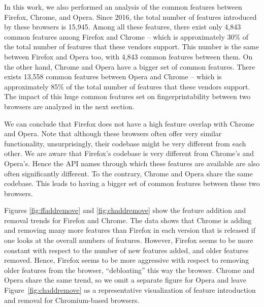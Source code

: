 
  In this work, we also performed an analysis of the common features
  between Firefox, Chrome, and Opera. Since 2016, the total number of features
  introduced by these browsers is 15,945. Among all these features,
  there exist only 4,843 common features among Firefox and Chrome -- which is
  approximately 30\% of the total number of features that these
  vendors support. This number is the same between Firefox and Opera too, with
  4,843 common features between them. On the other hand, Chrome and Opera
  have a bigger set of common features. There exists 13,558 
  common features between Opera and Chrome -- which is approximately 85\% of the total
  number of features that these vendors support. The impact of this huge common features set
  on fingerprintability between two browsers are analyzed in the next section.

  We can conclude that Firefox does not have a high feature overlap with Chrome and Opera.
  Note that although these browsers often offer very similar functionality,
  unsurprisingly, their codebase might be very different from each other.
  We are aware that Firefox's codebase is very different from Chrome's and Opera's.
  Hence the API names through which these features are available are also often
  significantly different. 
  To the contrary, Chrome and Opera share the same codebase.
  This leads to having a bigger set of common features between these two browsers. %

  Figures \ref{fig:ffaddremove} and \ref{fig:chaddremove} show the
  feature addition and removal trends for Firefox and Chrome. The data
  shows that Chrome is adding and removing many more features than
  Firefox in each version that is released if one looks at the overall
  numbers of features. However, Firefox seems to be more constant with
  respect to the number of new features added, and older features
  removed. Hence, Firefox seems to be more aggressive with respect to
  removing older features from the browser, ``debloating'' this way 
  the browser. Chrome and Opera share the same trend, so we omit a separate figure for Opera and leave Figure~\ref{fig:chaddremove} as a representative visualization of feature introduction and removal for Chromium-based browsers.

